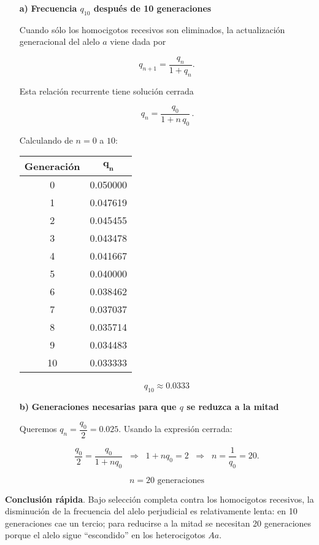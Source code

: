 \documentclass{article}
\begin{document}
\begin{enumerate}
\item[\textbf{a)}] \textbf{Frecuencia \(q_{10}\) después de 10 generaciones}

Cuando sólo los homocigotos recesivos son eliminados, la actualización generacional del alelo \(a\) viene dada por  

\[
q_{n+1} = \frac{q_n}{1 + q_n}.
\]

Esta relación recurrente tiene solución cerrada  

\[
\boxed{\,q_n = \dfrac{q_0}{1 + n\,q_0}\,}.
\]

Calculando de \(n = 0\) a \(10\):

\begin{center}
\begin{tabular}{|c|c|}
\hline
\textbf{Generación} & \(\boldsymbol{q_n}\) \\
\hline
0  & 0.050000 \\
1  & 0.047619 \\
2  & 0.045455 \\
3  & 0.043478 \\
4  & 0.041667 \\
5  & 0.040000 \\
6  & 0.038462 \\
7  & 0.037037 \\
8  & 0.035714 \\
9  & 0.034483 \\
10 & 0.033333 \\
\hline
\end{tabular}
\end{center}

\[
\boxed{q_{10} \approx 0.0333}
\]

\item[\textbf{b)}] \textbf{Generaciones necesarias para que \(q\) se reduzca a la mitad}

Queremos \(q_n = \dfrac{q_0}{2} = 0.025\).  
Usando la expresión cerrada:

\[
\frac{q_0}{2} = \frac{q_0}{1 + n q_0}
\;\;\Longrightarrow\;\;
1 + n q_0 = 2
\;\;\Longrightarrow\;\;
n = \frac{1}{q_0} = 20.
\]

\[
\boxed{n = 20 \text{ generaciones}}
\]
\end{enumerate}

\textbf{Conclusión rápida}.  
Bajo selección completa contra los homocigotos recesivos, la disminución de la frecuencia del alelo perjudicial es relativamente lenta: en 10 generaciones cae un tercio; para reducirse a la mitad se necesitan 20 generaciones porque el alelo sigue “escondido” en los heterocigotos \(Aa\).
\end{document}
